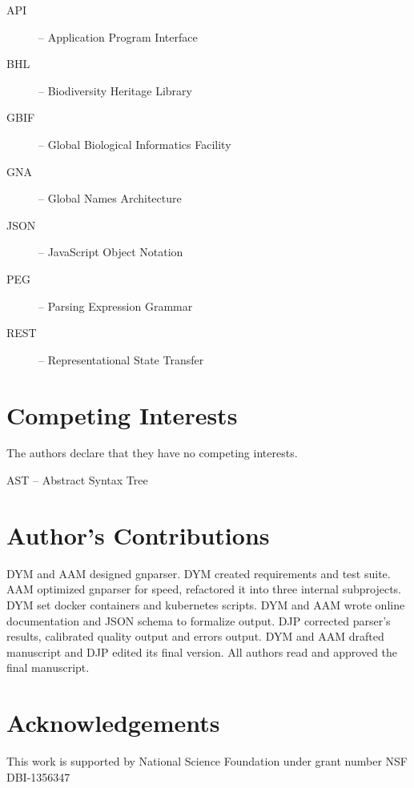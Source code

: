 \documentclass{bmcart}
\begin{document}
\begin{description}
  \item[API] -- Application Program Interface
  \item[BHL] -- Biodiversity Heritage Library
  \item[GBIF] -- Global Biological Informatics Facility
  \item[GNA] -- Global Names Architecture
  \item[JSON] -- JavaScript Object Notation
  \item[PEG] -- Parsing Expression Grammar
  \item[REST] -- Representational State Transfer
\end{description}

\section*{Competing Interests}

The authors declare that they have no competing interests.

AST -- Abstract Syntax Tree

\section*{Author's Contributions}

DYM and AAM designed gnparser. DYM created requirements and test suite. AAM
optimized gnparser for speed, refactored it into three internal subprojects.
DYM set docker containers and kubernetes scripts. DYM and AAM wrote online
documentation and JSON schema to formalize output. DJP corrected parser's
results, calibrated quality output and errors output. DYM and AAM drafted
manuscript and DJP edited its final version. All authors read and approved the
final manuscript.

\section*{Acknowledgements}

This work is supported by National Science Foundation under grant number NSF
DBI-1356347



\end{document}
